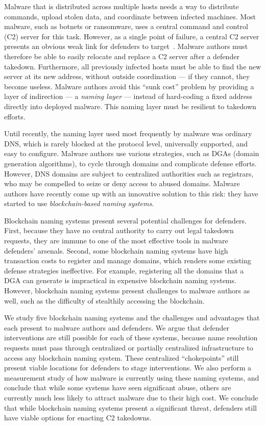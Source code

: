 Malware that is distributed across multiple hosts 
needs a way to distribute 
commands, upload stolen 
data, and coordinate between infected machines. Most malware, 
such as botnets or 
ransomware, uses a 
central command and control (C2) server for this task. However, as a single 
point of failure, a 
central C2 server presents an obvious weak link for defenders to 
target~\cite{kesari_deterring_2017}. 
Malware authors must therefore be able to easily relocate and replace a C2 
server after a defender 
takedown. Furthermore, all previously infected hosts must be 
able to find the new server at 
its new address, 
without outside coordination --- if they cannot, they become useless. Malware 
authors avoid 
this ``sunk cost'' problem by providing a layer of 
indirection --- a \emph{naming 
layer} --- instead of 
hard-coding a fixed address directly into deployed malware. 
This 
naming layer must be 
resilient to takedown efforts.

Until recently, the naming layer used most frequently by malware was ordinary 
DNS, which is rarely 
blocked at the protocol level, universally supported, and easy to configure. 
Malware authors use 
various strategies, such as DGAs (domain generation 
algorithms), 
to cycle through domains and complicate defense efforts. 
However, 
DNS domains are subject 
to centralized authorities such as registrars, who may be 
compelled to 
seize or deny access to abused 
domains. Malware 
authors have recently come up with an innovative solution to this risk: they 
have started to use 
\emph{blockchain-based naming systems}. 

Blockchain naming systems present several potential 
challenges for 
defenders. First, because they 
have no central authority to carry out legal takedown 
requests, they are immune to one of the most effective tools 
in malware defenders' arsenals. Second, some blockchain 
naming systems 
have high transaction costs to register and manage domains, 
which renders some existing defense 
strategies ineffective. For example, registering all the 
domains 
that a DGA can generate 
is impractical in expensive blockchain naming systems. 
However, blockchain naming systems 
present challenges to malware authors as well, such as the 
difficulty of stealthily accessing the blockchain.

We study five blockchain naming systems and the challenges 
and advantages that each present to malware authors and 
defenders. We argue that defender interventions are still 
possible for each of these systems, because name resolution 
requests must pass through centralized or partially 
centralized infrastructure to access any blockchain naming 
system. These centralized ``chokepoints'' still present 
viable locations for defenders to stage interventions. We 
also perform a measurement study of how malware is currently 
using these naming systems, and conclude that while some 
systems have seen significant abuse, others are currently 
much less likely to attract malware due to their high cost. 
We conclude that while blockchain 
naming systems present a significant threat, defenders still 
have viable options for enacting C2 takedowns.

